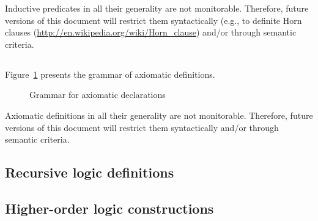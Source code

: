 Inductive predicates in all their generality are not monitorable. Therefore,
future versions of this document will restrict them syntactically (e.g., to
definite Horn clauses (\url{http://en.wikipedia.org/wiki/Horn_clause}) and/or
through semantic criteria.


\subsection{}
\label{sec:axiomatic}
\experimental

\nodiff

Figure~\ref{fig:gram:logicdecl} presents the grammar of axiomatic definitions.

\begin{figure}[htbp]
  \caption{Grammar for axiomatic declarations}
\label{fig:gram:logicdecl}
\end{figure}

Axiomatic definitions in all their generality are not monitorable. Therefore,
future versions of this document will restrict them syntactically and/or
through semantic criteria.


\subsection{}
\label{sec:polym-logic-types}
\nodiff


\subsection{Recursive logic definitions}
\nodiff


\subsection{Higher-order logic constructions}
\label{sec:higherorder}


